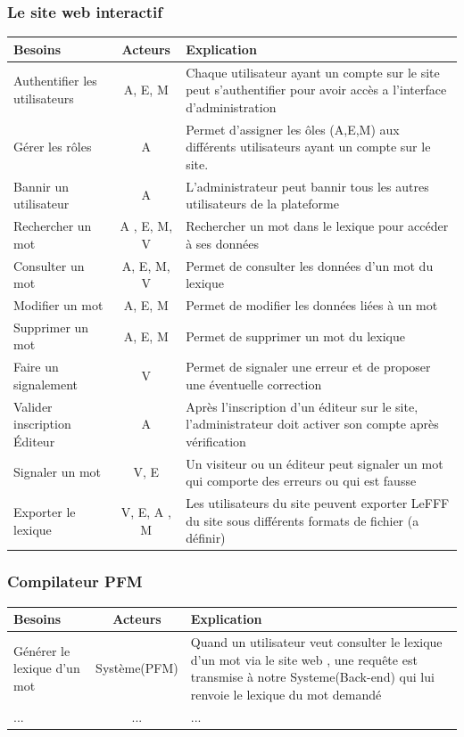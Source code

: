 \documentclass[12pt,a4paper]{article}
\begin{document}
\subsubsection{Le site web interactif}
\begin{tabularx}{\textwidth}{|l|c|X|}
  \hline
  \textbf{Besoins} & 
  \textbf{Acteurs} & 
  \textbf{Explication} \\
  \hline
  Authentifier les utilisateurs & 
  A, E, M & 
  Chaque utilisateur ayant un compte sur le site peut s'authentifier pour avoir accès a l'interface d'administration \\ 
  \hline
  Gérer les rôles & A
   & Permet d'assigner les ôles (A,E,M) aux différents utilisateurs ayant un compte sur le site.
 \\
  \hline
  Bannir un utilisateur& 
  A & 
  L'administrateur peut bannir tous les autres utilisateurs de la plateforme \\
  \hline
  Rechercher un mot & 
  A , E, M, V & 
  Rechercher un mot dans le lexique pour accéder à ses données \\
  \hline
  Consulter un mot &
  A, E, M, V &
  Permet de consulter les données d'un mot du lexique \\
  \hline
  Modifier un mot &
  A, E, M & 
  Permet de modifier les données liées à un mot \\
  \hline
  Supprimer un mot &
  A, E, M & 
  Permet de supprimer un mot du lexique \\
  \hline
  Faire un signalement & 
  V &
  Permet de signaler une erreur et de proposer une éventuelle correction \\
  \hline
  Valider inscription Éditeur &
  A &
  Après l'inscription d'un éditeur sur le site, l'administrateur doit activer son compte après vérification \\
  \hline
  Signaler un mot &
  V, E &
  Un visiteur ou un éditeur peut signaler un mot qui comporte des erreurs ou qui est fausse \\
  \hline
  Exporter le lexique &
  V, E, A , M &
  Les utilisateurs du site peuvent exporter LeFFF du site sous différents formats de fichier (a définir)\\
  \hline
\end{tabularx}

\subsubsection{Compilateur PFM}
\begin{tabularx}{\textwidth}{|l|c|X|}
  \hline
  Besoins & Acteurs & Explication \\
  \hline
  Générer le lexique d'un mot &
  Système(PFM)
  & Quand un utilisateur veut consulter le lexique d'un mot via le site web , une requête est transmise à notre Systeme(Back-end) qui lui renvoie le lexique du mot demandé \\
  \hline
  ...
  & ... 
  & ... \\

  \hline
\end{tabularx}
\end{document}
